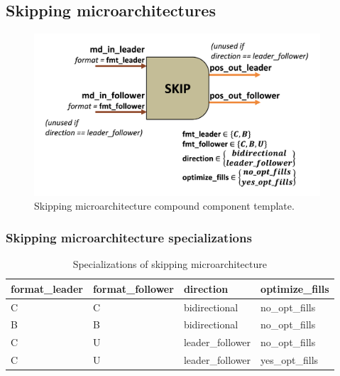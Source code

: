\subsection{Skipping microarchitectures}

\begin{figure}[H]
    \centering
    \includegraphics[width=0.95\textwidth]{figures/SKIP.png}
    \caption{Skipping microarchitecture compound component template.}
    \label{fig:SKIP}
\end{figure}

\subsubsection{Skipping microarchitecture specializations}

\begin{table}[ht]
\centering
\begin{tabular}{llll}
\toprule
 format\_leader   & format\_follower   & direction       & optimize\_fills   \\
\midrule
 C               & C                 & bidirectional   & no\_opt\_fills     \\
 B               & B                 & bidirectional   & no\_opt\_fills     \\
 C               & U                 & leader\_follower & no\_opt\_fills     \\
 C               & U                 & leader\_follower & yes\_opt\_fills    \\
\bottomrule
\end{tabular}
\caption{Specializations of skipping microarchitecture}
\label{tab:Skipping microarchitecture_specializations}
\end{table}

